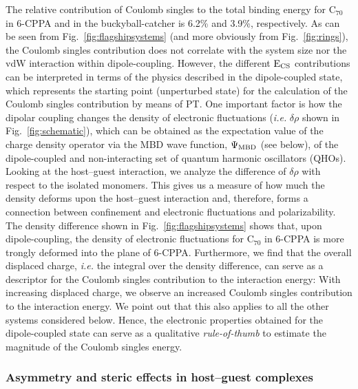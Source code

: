 \documentclass[aps,prl,groupaddress, twocolumn]{revtex4-1}  %
\begin{document}
The relative contribution of Coulomb singles to the total binding energy for C$_{70}$ in 6-CPPA and in the buckyball-catcher is 6.2\% and 3.9\%, respectively.
As can be seen from Fig.~\ref{fig:flagshipsystems} (and more obviously from Fig.~\ref{fig:rings}), the Coulomb singles contribution does not correlate with the system size nor the vdW interaction within dipole-coupling.
However, the different $\rm E_{CS}$ contributions can be interpreted in terms of the physics described in the dipole-coupled state, which represents the starting point (unperturbed state) for the calculation of the Coulomb singles contribution by means of PT\@.
One important factor is how the dipolar coupling changes the density of electronic fluctuations (\textit{i.e.} $\delta\rho$ shown in Fig.~\ref{fig:schematic}), which can be obtained as the expectation value of the charge density operator via the MBD wave function, $\Psi_{\rm MBD}$ (see below), of the dipole-coupled and non-interacting set of quantum harmonic oscillators (QHOs).
Looking at the host--guest interaction, we analyze the difference of $\delta\rho$ with respect to the isolated monomers.
This gives us a measure of how much the density deforms upon the host--guest interaction and, therefore, forms a connection between confinement and electronic fluctuations and polarizability.
The density difference shown in Fig.~\ref{fig:flagshipsystems} %
shows that, upon dipole-coupling, the density of electronic fluctuations for C$_{70}$ in 6-CPPA is more trongly deformed into the plane of 6-CPPA\@.
Furthermore, we find that the overall displaced charge, \textit{i.e.} the integral over the density difference, can serve as a descriptor for the Coulomb singles contribution to the interaction energy:
With increasing displaced charge, we observe an increased Coulomb singles contribution to the interaction energy. We point out that this also applies to all the other systems considered below.
Hence, the electronic properties obtained for the dipole-coupled state can serve as a qualitative \emph{rule-of-thumb} to estimate the magnitude of the Coulomb singles energy.

\subsubsection*{Asymmetry and steric effects in host--guest complexes}
\end{document}
